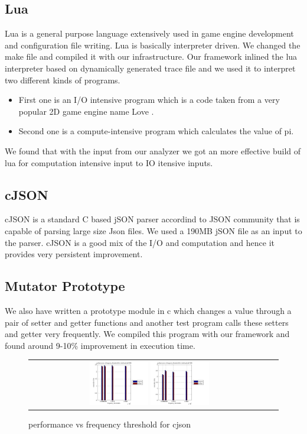 \documentclass{sigplanconf}
\begin{document}
\subsection{Lua}
Lua is a general purpose language extensively used in game engine development and configuration file writing\cite{lua}. Lua is basically interpreter driven. We changed the make file and compiled it with our infrastructure. Our framework inlined the lua interpreter based on dynamically generated trace file and we used it to interpret two different kinds of programs. 
\begin{itemize}
	\item First one is an I/O intensive program which is a code taken from a very popular 2D game engine name Love \cite{love}.
	\item Second one is a compute-intensive program which calculates the value of pi.
\end{itemize}
 We found that with the input from our analyzer we got an more effective build of lua for computation intensive input to IO itensive inputs.

\subsection{cJSON}
cJSON is a standard C based jSON parser accordind to JSON community \cite{json} that is capable of parsing large size Json files. We used a 190MB jSON file as an input to the parser. cJSON is a good mix of the I/O and computation and hence it provides very persistent improvement.

\subsection{Mutator Prototype}
We also have written a prototype module in c which changes a value through a pair of setter and getter functions and another test program calls these setters and getter very frequently. We compiled this program with our framework and found around 9-10\% improvement in execution time. 
 \begin{figure}
	\centering
        \begin{tabular}{cc}
		 	\includegraphics[width=0.25\textwidth]{cj_ft-time4.jpg}
        		\includegraphics[width=0.25\textwidth]{cj_ft-time5.jpg}&
		\end{tabular}
	 \label{cj_ft_time}\caption{performance vs frequency threshold for cjson}
 \end{figure}
\end{document}
